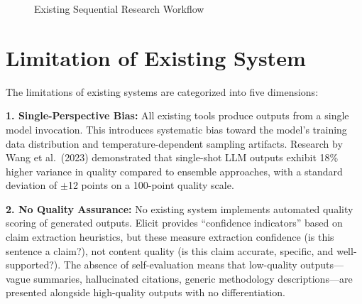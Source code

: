 \documentclass[a4paper,12pt,openany]{report}
\begin{document}
\begin{figure}[H]
\centering
{}
\caption{Existing Sequential Research Workflow}
\label{fig:existing_workflow}
\end{figure}

\section{Limitation of Existing System}

The limitations of existing systems are categorized into five dimensions:

\textbf{1. Single-Perspective Bias:} All existing tools produce outputs from a single model invocation. This introduces systematic bias toward the model's training data distribution and temperature-dependent sampling artifacts. Research by Wang et al.\ (2023) demonstrated that single-shot LLM outputs exhibit 18\% higher variance in quality compared to ensemble approaches, with a standard deviation of $\pm$12 points on a 100-point quality scale.

\textbf{2. No Quality Assurance:} No existing system implements automated quality scoring of generated outputs. Elicit provides ``confidence indicators'' based on claim extraction heuristics, but these measure extraction confidence (is this sentence a claim?), not content quality (is this claim accurate, specific, and well-supported?). The absence of self-evaluation means that low-quality outputs---vague summaries, hallucinated citations, generic methodology descriptions---are presented alongside high-quality outputs with no differentiation.
\end{document}
